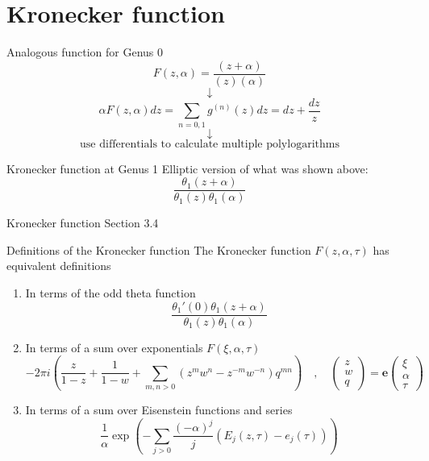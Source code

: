 \documentclass[11pt,aspectratio=169]{beamer}
\newcommand{\ee}[0]{\mathbf{e}}
\begin{document}
\section{Kronecker function}

\begin{frame}{Analogous function for Genus 0}
    \[F(z,\alpha) = \frac{(z+\alpha)}{(z)(\alpha)}\]
    \[\downarrow\]
    \[\alpha F(z,\alpha) dz = \sum_{n=0,1} g^{(n)}(z) dz = dz + \frac{dz}{z}\]
    \[\downarrow\]
    \[\text{use differentials to calculate multiple polylogarithms}\]

    \begin{block}{Kronecker function at Genus 1}
        Elliptic version of what was shown above:
        \[\frac{\theta_1(z+\alpha)}{\theta_1(z)\theta_1(\alpha)}\]
    \end{block}
\end{frame}

\begin{frame}{Kronecker function}{\tiny \cite{BL13} Section 3.4}
    \begin{block}{Definitions of the Kronecker function}
        The Kronecker function $F(z,\alpha,\tau)$ has equivalent definitions
        \begin{enumerate}
            \item In terms of the odd theta function
            \[\frac{\theta_1'(0)\theta_1(z+\alpha)}{\theta_1(z)\theta_1(\alpha)}\]
            \item In terms of a sum over exponentials $F(\xi,\alpha,\tau)$
            \[-2\pi i \left(\frac{z}{1-z} + \frac{1}{1-w} + \sum_{m,n > 0} (z^m w^n - z^{-m} w^{-n}) q^{mn}\right) \quad , \quad \begin{pmatrix} z \\ w \\ q \end{pmatrix} = \ee \begin{pmatrix}\xi \\ \alpha \\ \tau\end{pmatrix}\]
            \item In terms of a sum over Eisenstein functions and series
            \[\frac{1}{\alpha} \exp\left(-\sum_{j > 0} \frac{(-\alpha)^j}{j} (E_j(z,\tau) - e_j(\tau))\right)\]
        \end{enumerate}
    \end{block}
\end{frame}
\end{document}
